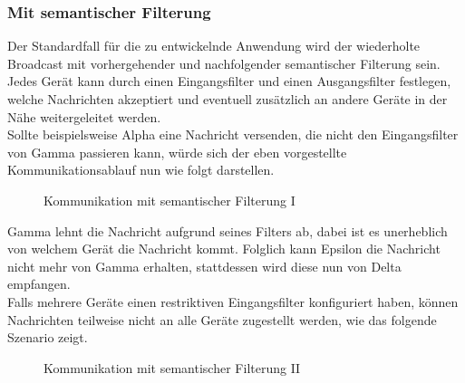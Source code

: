 \subsubsection{Mit semantischer Filterung}
Der Standardfall für die zu entwickelnde Anwendung wird der wiederholte Broadcast mit vorhergehender und nachfolgender semantischer Filterung sein. Jedes Gerät kann durch einen Eingangsfilter und einen Ausgangsfilter festlegen, welche Nachrichten akzeptiert und eventuell zusätzlich an andere Geräte in der Nähe weitergeleitet werden. 
\\Sollte beispielsweise Alpha eine Nachricht versenden, die nicht den Eingangsfilter von Gamma passieren kann, würde sich der eben vorgestellte Kommunikationsablauf nun wie folgt darstellen.
\begin{figure}[H]
	\centering
	\hspace*{1cm}
	\caption{Kommunikation mit semantischer Filterung I}
	\label{fig:beispielszenario2}
\end{figure}
Gamma lehnt die Nachricht aufgrund seines Filters ab, dabei ist es unerheblich von welchem Gerät die Nachricht kommt. Folglich kann Epsilon die Nachricht nicht mehr von Gamma erhalten, stattdessen wird diese nun von Delta empfangen. 
\\Falls mehrere Geräte einen restriktiven Eingangsfilter konfiguriert haben, können Nachrichten teilweise nicht an alle Geräte zugestellt werden, wie das folgende Szenario zeigt.
\begin{figure}[H]
	\centering
	\hspace*{1cm}
	\caption{Kommunikation mit semantischer Filterung II}
	\label{fig:beispielszenario3}
\end{figure}
